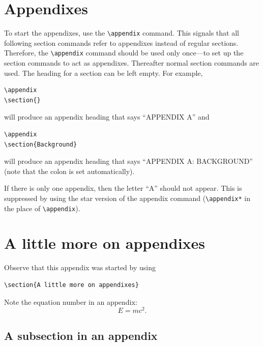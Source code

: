 \documentclass[%
 aip,
 amsmath,amssymb,
preprint,%
]{revtex4-1}
\begin{document}
\appendix

\section{Appendixes}

To start the appendixes, use the \verb+\appendix+ command.
This signals that all following section commands refer to appendixes
instead of regular sections. Therefore, the \verb+\appendix+ command
should be used only once---to set up the section commands to act as
appendixes. Thereafter normal section commands are used. The heading
for a section can be left empty. For example,
\begin{verbatim}
\appendix
\section{}
\end{verbatim}
will produce an appendix heading that says ``APPENDIX A'' and
\begin{verbatim}
\appendix
\section{Background}
\end{verbatim}
will produce an appendix heading that says ``APPENDIX A: BACKGROUND''
(note that the colon is set automatically).

If there is only one appendix, then the letter ``A'' should not
appear. This is suppressed by using the star version of the appendix
command (\verb+\appendix*+ in the place of \verb+\appendix+).

\section{A little more on appendixes}

Observe that this appendix was started by using
\begin{verbatim}
\section{A little more on appendixes}
\end{verbatim}

Note the equation number in an appendix:
\begin{equation}
E=mc^2.
\end{equation}

\subsection{\label{app:subsec}A subsection in an appendix}
\end{document}
